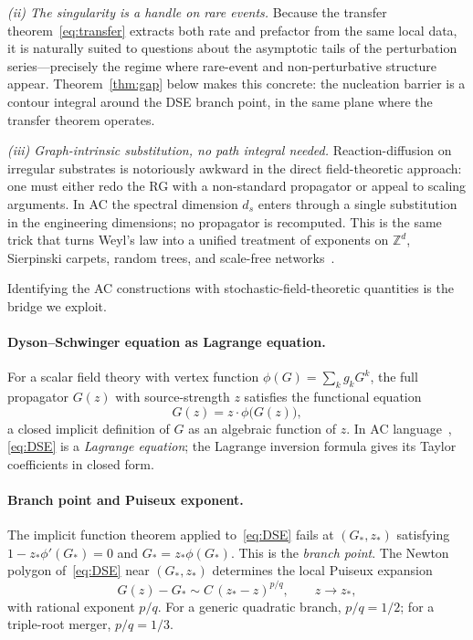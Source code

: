 \documentclass[11pt,a4paper]{article}
\theoremstyle{plain}
\begin{document}
\emph{(ii) The singularity is a handle on rare events.}
Because the transfer theorem~\eqref{eq:transfer} extracts both
rate and prefactor from the same local data, it is naturally
suited to questions about the asymptotic tails of the
perturbation series---precisely the regime where rare-event and
non-perturbative structure appear.  Theorem~\ref{thm:gap} below
makes this concrete: the nucleation barrier is a contour integral
around the DSE branch point, in the same plane where the transfer
theorem operates.

\emph{(iii) Graph-intrinsic substitution, no path integral needed.}
Reaction-diffusion on irregular substrates is notoriously awkward
in the direct field-theoretic approach: one must either redo the
RG with a non-standard propagator or appeal to scaling arguments.
In AC the spectral dimension $d_s$ enters through a single
substitution in the engineering dimensions; no propagator is
recomputed.  This is the same trick that turns Weyl's law into a
unified treatment of exponents on $\mathbb{Z}^d$, Sierpinski
carpets, random trees, and scale-free
networks~\citep{AmarteifioBRW}.

Identifying the AC constructions with stochastic-field-theoretic
quantities is the bridge we exploit.

\paragraph{Dyson--Schwinger equation as Lagrange equation.}
For a scalar field theory with vertex function
$\phi(G) = \sum_k g_k G^k$, the full propagator $G(z)$ with
source-strength $z$ satisfies the functional
equation~\cite{BognerWeinzierl}
\begin{equation}\label{eq:DSE}
  G(z) = z \cdot \phi\bigl(G(z)\bigr),
\end{equation}
a closed implicit definition of $G$ as an algebraic function of
$z$.  In AC language~\cite{FlajoletSedgewick}, \eqref{eq:DSE} is
a \emph{Lagrange equation}; the Lagrange inversion formula gives
its Taylor coefficients in closed form.

\paragraph{Branch point and Puiseux exponent.}
The implicit function theorem applied to~\eqref{eq:DSE} fails at
$(G_*, z_*)$ satisfying $1 - z_*\phi'(G_*) = 0$ and $G_* =
z_*\phi(G_*)$.  This is the \emph{branch point}.  The Newton
polygon of~\eqref{eq:DSE} near $(G_*, z_*)$ determines the local
Puiseux expansion
\begin{equation}
  G(z) - G_* \sim C\,(z_* - z)^{p/q},\qquad z \to z_*,
\end{equation}
with rational exponent $p/q$.  For a generic quadratic branch,
$p/q = 1/2$; for a triple-root merger, $p/q = 1/3$.
\end{document}
